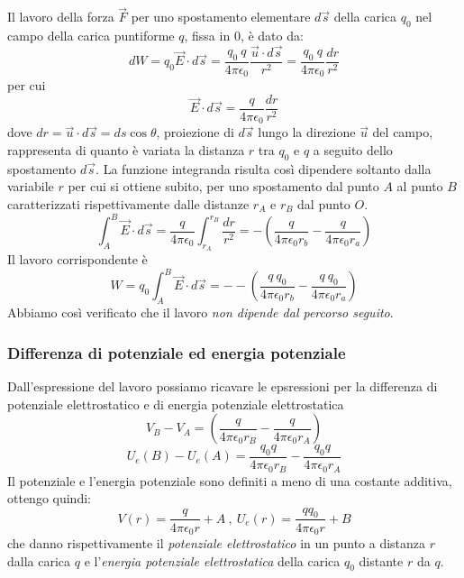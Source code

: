 \documentclass[class=book, crop=false, oneside, 12pt]{standalone}
\begin{document}
Il lavoro della forza \(\overrightarrow{F}\) per uno spostamento elementare \(d \overrightarrow{s}\) della carica \(q_0\) nel campo della carica puntiforme \(q\), fissa in \(0\), è dato da:
\begin{equation*}
    d W = q_0 \overrightarrow{E} \cdot d \overrightarrow{s} = \frac{q_0 \ q}{4 \pi \epsilon_0} \frac{\overrightarrow{u} \cdot d \overrightarrow{s}}{r^2} = \frac{q_0 \ q}{ 4 \pi \epsilon_0} \frac{d r }{r^2}
\end{equation*}
per cui
\begin{equation*}
    \overrightarrow{E} \cdot d \overrightarrow{s} = \frac{q}{4 \pi \epsilon_0} \frac{d r }{r^2}
\end{equation*}
dove \(dr = \overrightarrow{u} \cdot d \overrightarrow{s} = ds \cos \theta\), proiezione di \(d \overrightarrow{s}\) lungo la direzione \(\overrightarrow{u}\) del campo, rappresenta di quanto è variata la distanza \(r\) tra \(q_0\) e \(q\) a seguito dello spostamento \(d \overrightarrow{s}\).  
La funzione integranda risulta così dipendere soltanto dalla variabile \(r\) per cui si ottiene subito, per uno spostamento dal punto \(A\) al punto \(B\) caratterizzati rispettivamente dalle distanze \(r_A\) e \(r_B\) dal punto \(O\).
\begin{equation}
    \int_A^B \overrightarrow{E} \cdot d \overrightarrow{s} = \frac{q}{4 \pi \epsilon_0} \int_{r_A}^{r_B} \frac{dr}{r^2} = - \left(\frac{q}{4 \pi \epsilon_0 r_b} - \frac{q}{4 \pi \epsilon_0 r_a}\right)
\end{equation}
Il lavoro corrispondente è
\begin{equation}
    W = q_0 \int_A^B \overrightarrow{E} \cdot d \overrightarrow{s} = -- \left (\frac{q \ q_0}{4 \pi \epsilon_0 r_b} - \frac{q \ q_0}{4 \pi \epsilon_0 r_a}\right)
\end{equation}
Abbiamo così verificato che il lavoro \emph{non dipende dal percorso seguito}.

\subsubsection*{Differenza di potenziale ed energia potenziale}

Dall'espressione del lavoro possiamo ricavare le epsressioni per la differenza di potenziale elettrostatico e di energia potenziale elettrostatica
\begin{equation}
    V_B - V_A = \left(\frac{q}{4 \pi \epsilon_0 r_B} - \frac{q}{4 \pi \epsilon_0 r_A}\right)
\end{equation}
\begin{equation}
    U_e(B) - U_e(A) = \frac{q_0 q}{4 \pi \epsilon_0 r_B} - \frac{q_0 q}{4 \pi \epsilon_0 r_A}
\end{equation}
Il potenziale e l'energia potenziale sono definiti a meno di una costante additiva, ottengo quindi:
\begin{equation*}
    V(r) = \frac{q}{4 \pi \epsilon_0 r} + A \ , \ U_e(r) = \frac{q q_0}{4 \pi \epsilon_0 r} + B 
\end{equation*}
che danno rispettivamente il \emph{potenziale elettrostatico} in un punto a distanza \(r\) dalla carica \(q\) e l'\emph{energia potenziale elettrostatica} della carica \(q_0\) distante \(r\) da \(q\). 
\end{document}
